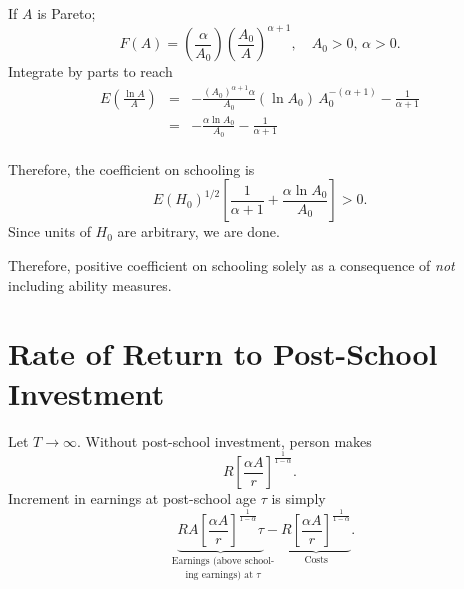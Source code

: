 \documentclass[12pt,compress,handout]{beamer}  %
\begin{document}
\begin{frame}

If $A$ is Pareto;
\begin{equation*}
    F(A) = \left( \frac{\alpha}{A_0}\right)\left(
    \frac{A_0}{A}\right)^{\alpha+1},
    \quad A_0>0,\,\alpha>0.
\end{equation*}
Integrate by parts to reach
\begin{eqnarray*}
    E\left( \frac{\ln A}{A}\right)
    &=&
    - \frac{(A_0)^{\alpha+1}\alpha}{A_0}(\ln A_0)\,A_0^{-(\alpha+1)} - \frac{1}{\alpha+1}\\
    &=&
    - \frac{\alpha\ln A_0}{A_0} - \frac{1}{\alpha+1}\\
\end{eqnarray*}

\end{frame}


\begin{frame}

Therefore, the coefficient on schooling is
\begin{equation*}
    E \left(H_0\right)^{1/2}
        \left[\frac{1}{\alpha+1}+\frac{\alpha\ln A_0}{A_0}\right] > 0.
\end{equation*}
Since units of $H_0$ are arbitrary, we are done.\bigskip

Therefore, positive coefficient on schooling solely as a consequence
of \emph{not} including ability measures.

\end{frame}


\section[Rate of Return]{Rate of Return to Post-School Investment}


\begin{frame}
\small
\begin{center}
    \textbf{\insertsection}
\end{center}

Let $T\rightarrow\infty$. Without post-school investment, person makes
\begin{equation*}
    R\left[\dfrac{\alpha A}{r}\right]^{\frac{1}{1-\alpha}}.
\end{equation*}
Increment in earnings at post-school age $\tau$ is simply
\begin{equation*}
    \underset{\text{ing earnings) at $\tau $}}{
    \underset{\text{Earnings (above school-}}{
    ~~~~
    \underbrace{
        RA\left[\dfrac{\alpha A}{r}\right]^{\frac{1}{1-\alpha}}\tau
    }-}}
    \underset{\text{Costs}}{
    \underbrace{
        R\left[\dfrac{\alpha A}{r}\right]^{\frac{1}{1-\alpha}}
    }}.
\end{equation*}

\end{frame}
\end{document}
